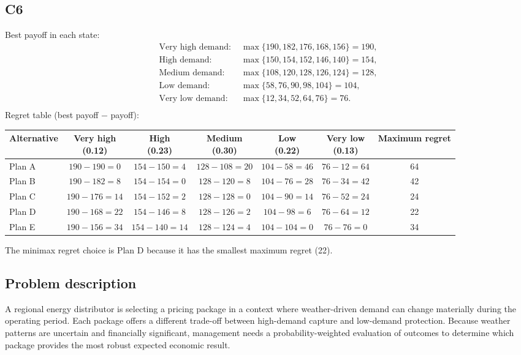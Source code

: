 \begin{ExamProblems}
		\subsection*{C6}
		Best payoff in each state:
		\[
		\begin{aligned}
			\text{Very high demand: } &\max\{190, 182, 176, 168, 156\} = 190, \\
			\text{High demand: } &\max\{150, 154, 152, 146, 140\} = 154, \\
			\text{Medium demand: } &\max\{108, 120, 128, 126, 124\} = 128, \\
			\text{Low demand: } &\max\{58, 76, 90, 98, 104\} = 104, \\
			\text{Very low demand: } &\max\{12, 34, 52, 64, 76\} = 76. \\
		\end{aligned}
		\]
		Regret table (best payoff $-$ payoff):
		\begin{center}
			\begin{tabular}{l c c c c c c}
				\toprule
				Alternative 
				& \shortstack{Very high \\ (0.12)}
				& \shortstack{High \\ (0.23)}
				& \shortstack{Medium \\ (0.30)}
				& \shortstack{Low \\ (0.22)}
				& \shortstack{Very low \\ (0.13)}
				& Maximum regret \\
				\midrule
				Plan A & $190-190=0$ & $154-150=4$ & $128-108=20$ & $104-58=46$ & $76-12=64$ & 64 \\
				Plan B & $190-182=8$ & $154-154=0$ & $128-120=8$ & $104-76=28$ & $76-34=42$ & 42 \\
				Plan C & $190-176=14$ & $154-152=2$ & $128-128=0$ & $104-90=14$ & $76-52=24$ & 24 \\
				Plan D & $190-168=22$ & $154-146=8$ & $128-126=2$ & $104-98=6$ & $76-64=12$ & 22 \\
				Plan E & $190-156=34$ & $154-140=14$ & $128-124=4$ & $104-104=0$ & $76-76=0$ & 34 \\
				\bottomrule
			\end{tabular}
		\end{center}
		The minimax regret choice is Plan D because it has the smallest maximum regret (22).
		\item
		\subsection*{Problem description}
		A regional energy distributor is selecting a pricing package in a context where weather-driven demand can change materially during the operating period. Each package offers a different trade-off between high-demand capture and low-demand protection. Because weather patterns are uncertain and financially significant, management needs a probability-weighted evaluation of outcomes to determine which package provides the most robust expected economic result.


\end{ExamProblems}
